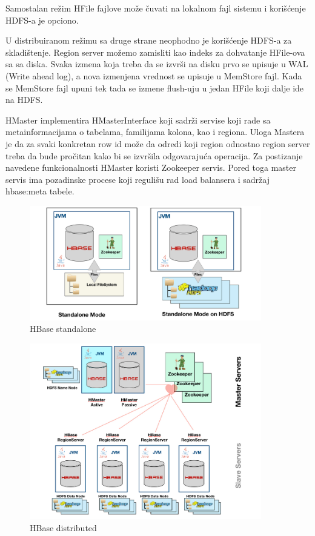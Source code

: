 \documentclass[12pt,oneside]{memoir}
\begin{document}
Samostalan režim HFile fajlove može čuvati na lokalnom fajl sistemu i korišćenje HDFS-a je opciono.

U distribuiranom režimu sa druge strane neophodno je korišćenje HDFS-a za skladištenje. Region server možemo zamisliti kao indeks za dohvatanje HFile-ova sa sa diska.  Svaka izmena koja treba da se izvrši na disku prvo se upisuje u WAL (Write ahead log), a nova izmenjena vrednost se upisuje u MemStore fajl. Kada se MemStore fajl upuni tek tada se izmene flush-uju u jedan HFile koji dalje ide na HDFS. 

HMaster implementira HMasterInterface koji sadrži servise koji rade sa metainformacijama o tabelama, familijama kolona, kao i regiona. Uloga Mastera je da za svaki konkretan row id može da odredi koji region odnostno region server treba da bude pročitan kako bi se izvršila odgovarajuća operacija. Za postizanje navedene funkcionalnosti HMaster koristi Zookeeper \cite{BigTable} servis. Pored toga master servis ima pozadinske procese koji regulišu rad load balansera i sadržaj hbase:meta tabele.

\begin{figure}[!ht]
  \centering
  \includegraphics[width=0.9\textwidth]{hbase-standalone.png}
  \caption{HBase standalone}
  \label{fig:grafikon}
\end{figure}

\begin{figure}[!ht]
  \centering
  \includegraphics[width=0.9\textwidth]{hbase-distributed.png}
  \caption{HBase distributed}
  \label{fig:grafikon}
\end{figure}
\end{document}
